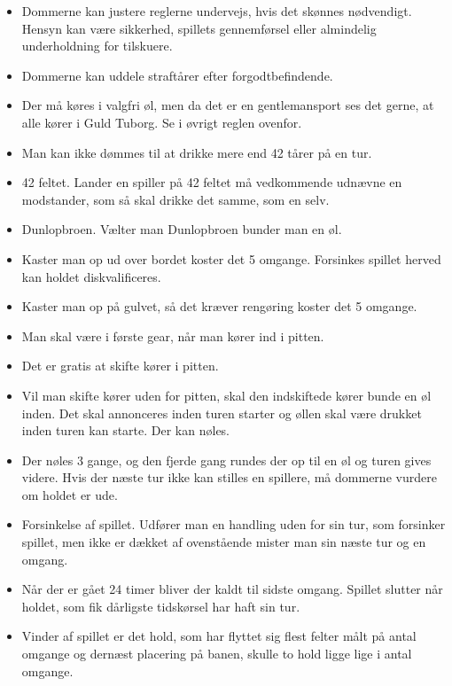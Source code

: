 \documentclass[12pt]{article}
\begin{document}
\begin{itemize}
	\item Dommerne kan justere reglerne undervejs, hvis det skønnes nødvendigt. Hensyn kan være sikkerhed, spillets gennemførsel eller almindelig underholdning for tilskuere.
	\item Dommerne kan uddele straftårer efter forgodtbefindende.
	\item Der må køres i valgfri øl, men da det er en gentlemansport ses det gerne, at alle kører i Guld Tuborg. Se i øvrigt reglen ovenfor.
	\item Man kan ikke dømmes til at drikke mere end 42 tårer på en tur.
	\item 42 feltet. Lander en spiller på 42 feltet må vedkommende udnævne en modstander, som så skal drikke det samme, som en selv.
	\item Dunlopbroen. Vælter man Dunlopbroen bunder man en øl.
	\item Kaster man op ud over bordet koster det 5 omgange. Forsinkes spillet herved kan holdet diskvalificeres.
	\item Kaster man op på gulvet, så det kræver rengøring koster det 5 omgange.
	\item Man skal være i første gear, når man kører ind i pitten.
	\item Det er gratis at skifte kører i pitten.
	\item Vil man skifte kører uden for pitten, skal den indskiftede kører bunde en øl inden. Det skal annonceres inden turen starter og øllen skal være drukket inden turen kan starte. Der kan nøles.
	\item Der nøles 3 gange, og den fjerde gang rundes der op til en øl og turen gives videre. Hvis der næste tur ikke kan stilles en spillere, må dommerne vurdere om holdet er ude.
	\item Forsinkelse af spillet. Udfører man en handling uden for sin tur, som forsinker spillet, men ikke er dækket af ovenstående mister man sin næste tur og en omgang.
	\item Når der er gået 24 timer bliver der kaldt til sidste omgang. Spillet slutter når holdet, som fik dårligste tidskørsel har haft sin tur.
	\item Vinder af spillet er det hold, som har flyttet sig flest felter målt på antal omgange og dernæst placering på banen, skulle to hold ligge lige i antal omgange.
\end{itemize}
\end{document}
